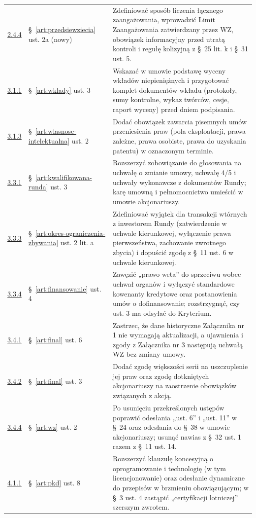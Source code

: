\documentclass[12pt,a4paper]{report}
\begin{document}
\begin{longtable}{@{}p{1.3cm} p{3.3cm} p{9.6cm}@{}}
\hyperref[memo:2.4.4]{2.4.4} & §~\ref{art:przedsiewziecia} ust. 2a (nowy) & Zdefiniować sposób liczenia łącznego zaangażowania, wprowadzić Limit Zaangażowania zatwierdzany przez WZ, obowiązek informacyjny przed utratą kontroli i regułę kolizyjną z §~25 lit. k i §~31 ust. 5. \\
\hyperref[memo:3.1.1]{3.1.1} & §~\ref{art:wklady} ust. 3 & Wskazać w umowie podstawę wyceny wkładów niepieniężnych i przygotować komplet dokumentów wkładu (protokoły, sumy kontrolne, wykaz twórców, cesje, raport wyceny) przed dniem podpisania. \\
\hyperref[memo:3.1.3]{3.1.3} & §~\ref{art:wlasnosc-intelektualna} ust. 2 & Dodać obowiązek zawarcia pisemnych umów przeniesienia praw (pola eksploatacji, prawa zależne, prawa osobiste, prawa do uzyskania patentu) w oznaczonym terminie. \\
\hyperref[memo:3.3.1]{3.3.1} & §~\ref{art:kwalifikowana-runda} ust. 3 & Rozszerzyć zobowiązanie do głosowania na uchwałę o zmianie umowy, uchwałę 4/5 i uchwały wykonawcze z dokumentów Rundy; karę umowną i pełnomocnictwo umieścić w umowie akcjonariuszy. \\
\hyperref[memo:3.3.3]{3.3.3} & §~\ref{art:okres-ograniczenia-zbywania} ust. 2 lit. a & Zdefiniować wyjątek dla transakcji wtórnych z inwestorem Rundy (zatwierdzenie w uchwale kierunkowej, wyłączenie prawa pierwszeństwa, zachowanie zwrotnego zbycia) i dopuścić zgodę z §~11 ust. 6 w uchwale kierunkowej. \\
\hyperref[memo:3.3.4]{3.3.4} & §~\ref{art:finansowanie} ust. 4 & Zawęzić „prawo weta” do sprzeciwu wobec uchwał organów i wyłączyć standardowe kowenanty kredytowe oraz postanowienia umów o dofinansowanie; rozstrzygnąć, czy ust. 3 ma odsyłać do Kryterium. \\
\hyperref[memo:3.4.1]{3.4.1} & §~\ref{art:final} ust. 6 & Zastrzec, że dane historyczne Załącznika nr 1 nie wymagają aktualizacji, a ujawnienia i zgody z Załącznika nr 3 następują uchwałą WZ bez zmiany umowy. \\
\hyperref[memo:3.4.2]{3.4.2} & §~\ref{art:final} ust. 3 & Dodać zgodę większości serii na uszczuplenie jej praw oraz zgodę dotkniętych akcjonariuszy na zaostrzenie obowiązków związanych z akcją. \\
\hyperref[memo:3.4.4]{3.4.4} & §~\ref{art:wz} ust. 2 & Po usunięciu przekreślonych ustępów poprawić odesłania „ust. 6” i „ust. 11” w §~24 oraz odesłania do §~38 w umowie akcjonariuszy; usunąć nawias z §~32 ust. 1 razem z §~11 ust. 14. \\
\hyperref[memo:4.1.1]{4.1.1} & §~\ref{art:pkd} ust. 8 & Rozszerzyć klauzulę koncesyjną o oprogramowanie i technologię (w tym licencjonowanie) oraz odesłanie dynamiczne do przepisów w brzmieniu obowiązującym; w §~3 ust. 4 zastąpić „certyfikacji lotniczej” szerszym zwrotem. \\

\end{longtable}
\end{document}
